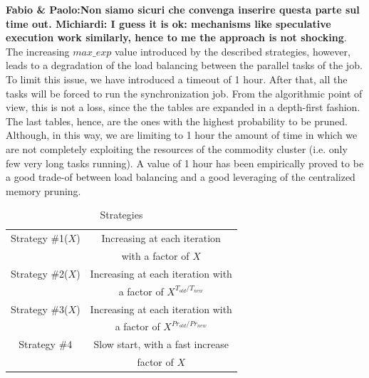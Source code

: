 \textbf{Fabio \& Paolo:Non siamo sicuri che convenga inserire questa parte sul time out. Michiardi: I guess it is ok: mechanisms like speculative execution work similarly, hence to me the approach is not shocking}.
The increasing $max\_exp$ value introduced by the described strategies, however, leads to a degradation of the load balancing between the parallel tasks of the job. To limit this issue, we have introduced a timeout of 1 hour. After that, all the tasks will be forced to run the synchronization job. From the algorithmic point of view, this is not a loss, since the the tables are expanded in a depth-first fashion. The last tables, hence, are the ones with the highest probability to be pruned. Although, in this way, we are limiting to 1 hour the amount of time in which we are not completely exploiting the resources of the commodity cluster (i.e. only few very long tasks running). A value of 1 hour has been empirically proved to be a good trade-of between load balancing and a good leveraging of the centralized memory pruning.

\begin{table}
\begin{center}
\caption{Strategies}
\label{table_strategies}
\begin{tabular}{|c|c|}
\hline
Strategy \#1($X$)  & Increasing at each iteration      \\ 
                   & with a factor of $X$               \\ \hline

Strategy \#2($X$)  & Increasing at each iteration with \\
                   & a factor of $X^{T_{old} / T_{new}}$                   \\ \hline


Strategy \#3($X$) & Increasing at each iteration with \\
                   & a factor of $X^{Pr_{old} / Pr_{new}}$                    \\ \hline
                   Strategy \#4       & Slow start, with a fast increase                      \\ 
     & factor of   $X$                     \\ \hline
            
\end{tabular}
\end{center}
\end{table}


